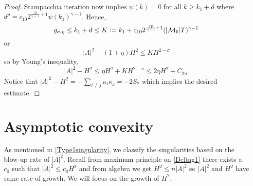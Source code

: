 \begin{proof}
        Stampacchia iteration now implies $ \psi(k) = 0 $ for all $ k \ge k_{1}+d $ where $ d^{p} =c_{10}2^{ \frac{\gamma p}{\gamma-1}+1}\psi(k_{1})^{\gamma-1}  $. Hence, 
        \[ g_{\sigma,\eta} \le k_{1}+d\le K := k_{1}+ c_{10} 2^{ \frac{\gamma p}{\gamma-1}+1}(|\mathcal{M}_{0}|T)^{\gamma-1}\]
        or 
        \begin{equation*}
            |A|^{2}-(1+\eta)H^{2} \le KH^{2-\sigma}
        \end{equation*}
        so by Young's inequality, \begin{equation*}
            |A|^{2}-H^{2}\le \eta H^{2}+KH^{2-\sigma} \le 2 \eta H^{2}+C_{2\eta}.
        \end{equation*}
        Notice that $ |A|^{2}-H^{2} = -\sum_{i\neq j}\kappa_{i}\kappa_{j} = -2S_{2} $ which implies the desired estimate.
    \end{proof}

    \section{Asymptotic convexity}
 
    As mentioned in \cref{Type1singularity}, we classify the singularities based on the blow-up rate of $ |A|^{2} $. Recall from maximum principle on \cref{Deltag1} there exists a $ c_{0} $ such that $ |A|^{2}\le c_{0}H^{2} $ and from algebra we get $ H^{2}\le n|A|^{2} $ so $ |A|^{2} $ and $ H^{2} $ have same rate of growth. We will focus on the growth of $ H^{2} $. 
    
